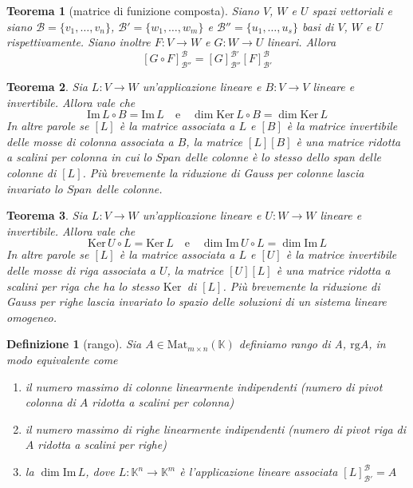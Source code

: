 \documentclass[9pt, a4paper]{article}
\newcommand{\K}{\mathbb{K}}
\newcommand{\Ker}{\mathrm{Ker}\,}
\newcommand{\Imm}{\mathrm{Im}\,}
\theoremstyle{mythm}
\newtheorem{definition}{Definizione}[section]
\newtheorem{thm}{Teorema}[section]
\begin{document}
\begin{thm}[matrice di funizione composta]
	Siano $ V $, $ W $ e $ U $ spazi vettoriali e siano \linebreak $ \mathscr{B} = \{v_1, \ldots, v_n\} $, $ \mathscr{B}' = \{w_1, \ldots, w_m\} $ e $ \mathscr{B}'' = \{u_1, \ldots, u_s\} $ basi di $ V $, $ W $ e $ U $ rispettivamente. Siano inoltre $ F \colon V \to W $ e $ G \colon W \to U $ lineari. Allora \[ \left [G \circ F \right ]_{\mathscr{B}''} ^{\mathscr{B}} = \left [G \right ]_{\mathscr{B}''} ^{\mathscr{B}'} \left [F \right ]_{\mathscr{B}'} ^{\mathscr{B}} \]
\end{thm}

\begin{thm}
	Sia $ L \colon V \to W $ un'applicazione lineare e $ B \colon V \to V $ lineare e invertibile. Allora vale che \[\Imm L \circ B = \Imm L \quad \mathrm{e} \quad \dim \Ker L \circ B = \dim  \Ker L\] In altre parole se $ \left [L \right ] $ è la matrice associata a $ L $ e $ \left [B \right ] $ è la matrice invertibile delle mosse di colonna associata a $ B $, la matrice $ \left [L \right ] \left [B \right ] $ è una matrice ridotta a scalini per colonna in cui lo $ Span $ delle colonne è lo stesso dello span delle colonne di $ \left [L \right ] $. Più brevemente la riduzione di Gauss per colonne lascia invariato lo $ Span $ delle colonne. 
\end{thm}

\begin{thm}
	Sia $ L \colon V \to W $ un'applicazione lineare e $ U \colon W \to W $ lineare e invertibile. Allora vale che \[\Ker U \circ L = \Ker L\quad \mathrm{e} \quad \dim \Imm U \circ L = \dim \Imm L  \] In altre parole se $ \left [L \right ] $ è la matrice associata a $ L $ e $ \left [U \right ] $ è la matrice invertibile delle mosse di riga associata a $ U $, la matrice $ \left [U \right ] \left [L \right ] $ è una matrice ridotta a scalini per riga che ha lo stesso $ \Ker $ di $ \left [L \right ] $. Più brevemente la riduzione di Gauss per righe lascia invariato lo spazio delle soluzioni di un sistema lineare omogeneo.
\end{thm}

\begin{definition}[rango]
	Sia $ A \in \mathrm{Mat}_{m \times n} (\K) $ definiamo rango di A, $ \mathrm{rg} A $, in modo equivalente come
	\begin{enumerate}
		\item il numero massimo di colonne linearmente indipendenti (numero di \emph{pivot} colonna di $ A $ ridotta a scalini per colonna)
		\item il numero massimo di righe linearmente indipendenti (numero di \emph{pivot} riga di $ A $ ridotta a scalini per righe)
		\item la $ \dim \Imm L $, dove $ L \colon \K^n \to \K^m $ è l'applicazione lineare associata $ \left [L \right ]_{\mathscr{B}'} ^{\mathscr{B}} = A $
	\end{enumerate}
\end{definition}
\end{document}
